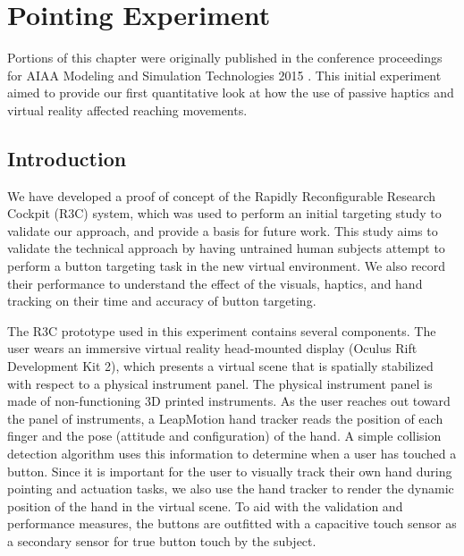 \chapter{Pointing Experiment}
\label{chap:pointing}

Portions of this chapter were originally published in the conference proceedings for AIAA Modeling and Simulation Technologies 2015 \citep{joyce_rapidly_2015}.
This initial experiment aimed to provide our first quantitative look at how the use of passive haptics and virtual reality affected reaching movements.

\section{Introduction}

We have developed a proof of concept of the Rapidly Reconfigurable Research Cockpit (R3C) system, which was used to perform an initial targeting study to validate our approach, and provide a basis for future work.
This study aims to validate the technical approach by having untrained human subjects attempt to perform a button targeting task in the new virtual environment.
We also record their performance to understand the effect of the visuals, haptics, and hand tracking on their time and accuracy of button targeting.

The R3C prototype used in this experiment contains several components.
The user wears an immersive virtual reality head-mounted display (Oculus Rift Development Kit 2), which presents a virtual scene that is spatially stabilized with respect to a physical instrument panel.
The physical instrument panel is made of non-functioning 3D printed instruments.
As the user reaches out toward the panel of instruments, a LeapMotion hand tracker reads the position of each finger and the pose (attitude and configuration) of the hand.
A simple collision detection algorithm uses this information to determine when a user has touched a button.
Since it is important for the user to visually track their own hand during pointing and actuation tasks, we also use the hand tracker to render the dynamic position of the hand in the virtual scene.
To aid with the validation and performance measures, the buttons are outfitted with a capacitive touch sensor as a secondary sensor for true button touch by the subject.

